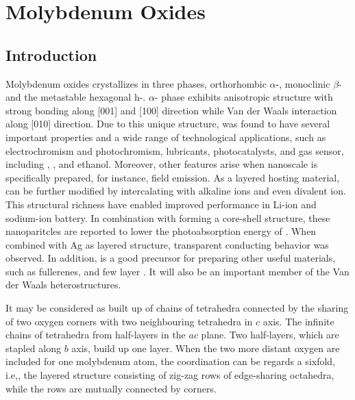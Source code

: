 \chapter{Molybdenum Oxides}

\section{Introduction}

Molybdenum oxides  crystallizes in three phases, orthorhombic $\alpha$-, monoclinic $\beta$- and the metastable hexagonal h-.\citep{Deb1968,Fibers2007} $\alpha$- phase exhibits anisotropic structure with strong bonding along [001] and [100] direction while Van der Waals interaction along [010] direction.\cite{He2003} Due to this unique structure,  was found to have several important properties and a wide range of technological applications, such as electrochromism and photochromism,\cite{Yao1992} lubricants,\cite{Sheehan1996} photocatalysts,\cite{Chen2010} and gas sensor, including ,\cite{Comini2005} ,\cite{Taurino2006} \cite{Sha2009} and ethanol.\cite{Choopun} Moreover, other features arise when nanoscale  is specifically prepared, for instance, field emission.\citep{Li2002d,Zhou2003b}  As a layered hosting material,  can be further modified by intercalating with alkaline ions\citep{Spahr1995,Li2006b,Hu2011} and even divalent ion\cite{Sian2005}. This structural richness have enabled improved performance in Li-ion\cite{Mai2007} and sodium-ion battery.\cite{Hariharan2013} In combination with  forming a core-shell structure, these nanoparitcles are reported to lower the photoabsorption energy of .\cite{Elder2000} When combined with Ag as layered structure, transparent conducting behavior was observed.\cite{Nguyen2012} In addition,  is a good precursor for preparing other useful materials, such as  fullerenes\cite{Li2003c}, and few layer .\cite{Lin2012}  It will also be an important member of the Van der Waals heterostructures.\cite{Geim2013}

It may be considered as built up of chains of  tetrahedra connected by the sharing of two oxygen corners with two neighbouring tetrahedra in $c$ axis. The infinite chains of  tetrahedra from half-layers in the $ac$ plane. Two half-layers, which are stapled along $b$ axis, build up one  layer. When the two more distant oxygen are included for one molybdenum atom, the coordination can be regards a sixfold, i.e,, the layered structure consisting of zig-zag rows of edge-sharing  octahedra, while the rows are mutually connected by corners.\cite{Itoh2001a}


